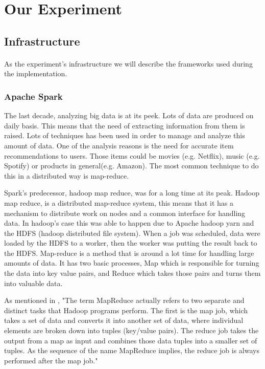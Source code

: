 \newpage
\section{Our Experiment}
\subsection{Infrastructure}
\paragraph{}As the experiment's infrastructure we will describe the frameworks used during the implementation.
\subsubsection{Apache Spark}
The last decade, analyzing big data is at its peek. Lots of data are produced on daily basis. This means that the need of extracting information from them is raised. 
Lots of techniques has been used in order to manage and analyze this amount of data. One of the analysis reasons is the need for accurate item recommendations to users. Those items could be movies (e.g. Netflix), music (e.g. Spotify) or products in general(e.g. Amazon). The most common technique to do this in a distributed way is map-reduce.

Spark's predecessor, hadoop map reduce, was for a long time at its peak.
 Hadoop map reduce, is a distributed map-reduce system, 
this means that it has a mechanism to distribute work on nodes 
and a common interface for handling data. In hadoop's case this was able
 to happen due to Apache hadoop yarn and the HDFS (hadoop distributed file system).
 When a job was scheduled, data were loaded by the HDFS to a worker, 
then the worker was putting the result back to the HDFS. 
Map-reduce is a method that is around a lot time for handling large amounts of data. 
It has two basic processes, Map which is responsible for turning the data into key value pairs, and Reduce which takes those pairs and turns them into valuable data.

As mentioned in \cite{ibmMapReduce:5}, "The term MapReduce actually refers to two separate and distinct tasks that Hadoop programs perform. The first is the map job, which takes a set of data and converts it into another set of data, where individual elements are broken down into tuples (key/value pairs). The reduce job takes the output from a map as input and combines those data tuples into a smaller set of tuples. As the sequence of the name MapReduce implies, the reduce job is always performed after the map job."


